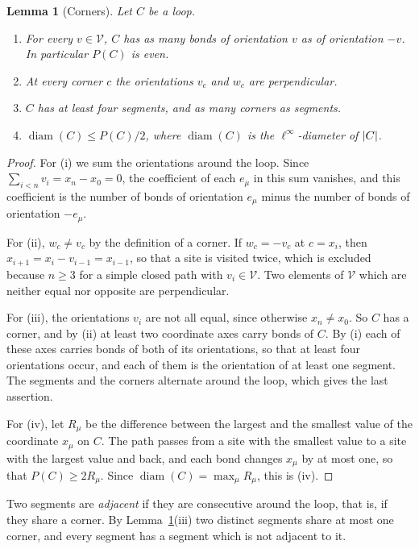 \documentclass[11pt]{preprint}
\newcommand{\diam}{\operatorname{diam}}
\DeclarePairedDelimiter{\abs}{\lvert}{\rvert}
\numberwithin{equation}{section}
\newtheorem{lemma}[theorem]{Lemma}
\theoremstyle{definition}
\theoremstyle{remark}
\theoremstyle{plain}
\begin{document}
\begin{lemma}[Corners]\label{lem:corners}
Let $C$ be a loop.
\begin{enumerate}[label=(\roman*)]
\item For every $v \in \mathcal V$, $C$ has as many bonds of orientation $v$ as of orientation $-v$. In particular $P(C)$ is even.
\item At every corner $c$ the orientations $v_c$ and $w_c$ are perpendicular.
\item $C$ has at least four segments, and as many corners as segments.
\item $\diam(C) \leq P(C)/2$, where $\diam(C)$ is the $\ell^\infty$-diameter of $\abs{C}$.
\end{enumerate}
\end{lemma}

\begin{proof}
For (i) we sum the orientations around the loop. Since $\sum_{i<n}v_i = x_n - x_0 = 0$, the coefficient of each $e_\mu$ in this sum vanishes, and this coefficient is the number of bonds of orientation $e_\mu$ minus the number of bonds of orientation $-e_\mu$.

For (ii), $w_c \neq v_c$ by the definition of a corner. If $w_c = -v_c$ at $c = x_i$, then $x_{i+1} = x_i - v_{i-1} = x_{i-1}$, so that a site is visited twice, which is excluded because $n \geq 3$ for a simple closed path with $v_i \in \mathcal V$. Two elements of $\mathcal V$ which are neither equal nor opposite are perpendicular.

For (iii), the orientations $v_i$ are not all equal, since otherwise $x_n \neq x_0$. So $C$ has a corner, and by (ii) at least two coordinate axes carry bonds of $C$. By (i) each of these axes carries bonds of both of its orientations, so that at least four orientations occur, and each of them is the orientation of at least one segment. The segments and the corners alternate around the loop, which gives the last assertion.

For (iv), let $R_\mu$ be the difference between the largest and the smallest value of the coordinate $x_\mu$ on $C$. The path passes from a site with the smallest value to a site with the largest value and back, and each bond changes $x_\mu$ by at most one, so that $P(C) \geq 2R_\mu$. Since $\diam(C) = \max_\mu R_\mu$, this is (iv).
\end{proof}

Two segments are \emph{adjacent} if they are consecutive around the loop, that is, if they share a corner. By Lemma~\ref{lem:corners}(iii) two distinct segments share at most one corner, and every segment has a segment which is not adjacent to it.
\end{document}
